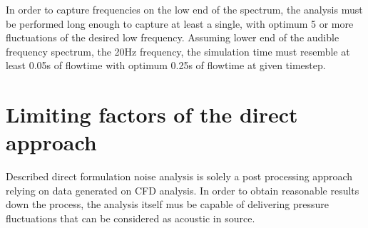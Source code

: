 







In order to capture frequencies on the low end of the spectrum, the analysis must be performed long enough to capture at least a single, with optimum 5 or more fluctuations of the desired low frequency. Assuming lower end of the audible frequency spectrum, the 20Hz frequency, the simulation time must resemble at least 0.05s of flowtime with optimum 0.25s of flowtime at given timestep.


\section{Limiting factors of the direct approach} \label{limits}
Described direct formulation noise analysis is solely a post processing approach relying on data generated on CFD analysis. In order to obtain reasonable results down the process, the analysis itself mus be capable of delivering pressure fluctuations that can be considered as acoustic in source. 

